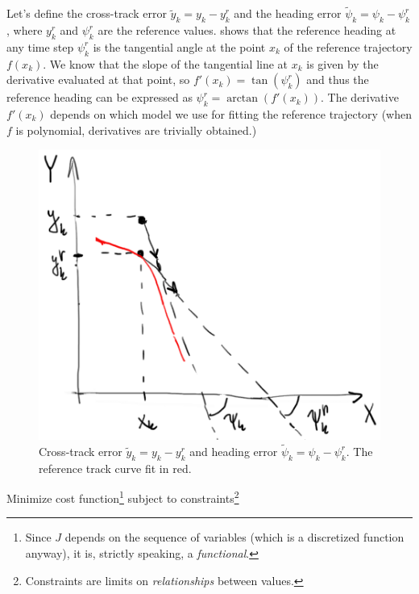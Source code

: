 \documentclass[a4paper]{article}
\begin{document}
Let's define the cross-track error \( \tilde{y}_k = y_k - y^r_k \) and the heading error \( \tilde{\psi}_k = \psi_k - \psi^r_k \), where \( y^r_k \) and \( \psi^r_k \) are the reference values.
 shows that the reference heading at any time step \( \psi^r_k \) is the tangential angle at the point \( x_k \) of the reference trajectory \( f(x_k) \).
We know that the slope of the tangential line at \( x_k \) is given by the derivative evaluated at that point, so \( f'(x_k) = \tan(\psi^r_k) \) and thus the reference heading can be expressed as \( \psi^r_k = \arctan( f'(x_k) ) \).
The derivative \( f'(x_k) \) depends on which model we use for fitting the reference trajectory (when \( f \) is polynomial, derivatives are trivially obtained.)
\begin{figure}[h]
	\centering
	\includegraphics[width=0.5\columnwidth]{./img/errors.png}
	\caption{Cross-track error \( \tilde{y}_k = y_k - y^r_k \) and heading error \( \tilde{\psi}_k = \psi_k - \psi^r_k \). The reference track curve fit in red.}
	\label{fig:errors}
\end{figure}

Minimize cost function\footnote{Since \( J \) depends on the sequence of variables (which is a discretized function anyway), it is, strictly speaking, a \emph{functional}.} subject to constraints\footnote{Constraints are limits on \emph{relationships} between values.}
\end{document}
